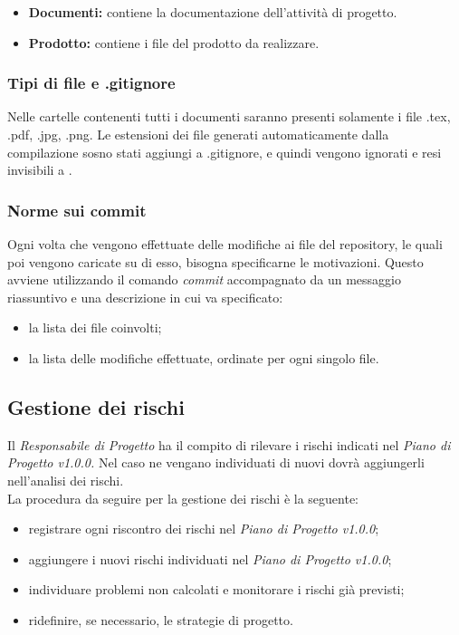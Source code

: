 \documentclass[../NormediProgetto.tex]{subfiles}
\begin{document}
	\begin{itemize}	
		\item \textbf{Documenti:} contiene la documentazione dell'attività di progetto.
		\item \textbf{Prodotto:} contiene i file del prodotto da realizzare.
	\end{itemize}
	
	\subsubsection{Tipi di file e .gitignore}
	
	Nelle cartelle contenenti tutti i documenti saranno presenti solamente i file .tex, .pdf, .jpg, .png. Le estensioni dei file generati automaticamente dalla compilazione sosno stati aggiungi a .gitignore, e quindi vengono ignorati e resi invisibili a .
	
	\subsubsection{Norme sui commit}
	
	Ogni volta che vengono effettuate delle modifiche ai file del repository, le quali poi vengono caricate su di esso, bisogna specificarne le motivazioni. Questo avviene utilizzando il comando \textit{commit} accompagnato da un messaggio riassuntivo e una descrizione in cui va specificato: 
	\begin{itemize}
		\item la lista dei file coinvolti;
		\item la lista delle modifiche effettuate, ordinate per ogni singolo file.
	\end{itemize}

	\subsection{Gestione dei rischi}
	
	Il \textit{Responsabile di Progetto} ha il compito di rilevare i rischi indicati nel \textit{Piano di Progetto v1.0.0.} Nel caso ne vengano individuati di nuovi dovrà aggiungerli nell'analisi dei rischi. 
	\\ \noindent La procedura da seguire per la gestione dei rischi è la seguente:
	\begin{itemize}
		\item registrare ogni riscontro dei rischi nel \textit{Piano di Progetto v1.0.0};
		\item aggiungere i nuovi rischi individuati nel \textit{Piano di Progetto v1.0.0};
		\item individuare problemi non calcolati e monitorare i rischi già previsti;
		\item ridefinire, se necessario, le strategie di progetto.
	\end{itemize}
	
\end{document}
